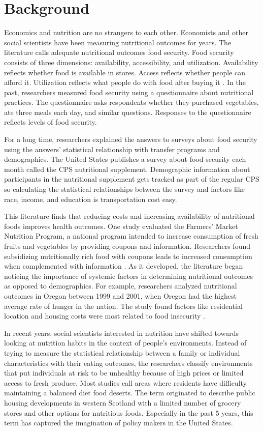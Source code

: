 \documentclass{report}
\begin{document}
\section{Background}

Economics and nutrition are no strangers to each other. Economists and other social scientists have been measuring nutritional outcomes for years. The literature calls adequate nutritional outcomes food security. Food security consists of three dimensions: availability, accessibility, and utilization. Availability reflects whether food is available in stores. Access reflects whether people can afford it. Utilization reflects what people do with food after buying it \cite{barrett}. In the past, researchers measured food security using a questionnaire about nutritional practices. The questionnaire asks respondents whether they purchased vegetables, ate three meals each day, and similar questions. Responses to the questionnaire reflects levels of food security.

For a long time, researchers explained the answers to surveys about food security using the answers' statistical relationship with transfer programs and demographics. The United States publishes a survey about food security each month called the CPS nutritional supplement. Demographic information about participants in the nutritional supplement gets tracked as part of the regular CPS so calculating the statistical relationships between the survey and factors like race, income, and education is transportation cost easy.

This literature finds that reducing costs and increasing availability of nutritional foods improves health outcomes. One study evaluated the Farmers' Market Nutrition Program, a national program intended to increase consumption of fresh fruits and vegetables by providing coupons and information. Researchers found subsidizing nutritionally rich food with coupons leads to increased consumption when complemented with information \cite{Just}. As it developed, the literature began noticing the importance of systemic factors in determining nutritional outcomes as opposed to demographics. For example, researchers analyzed nutritional outcomes in Oregon between 1999 and 2001, when Oregon had the highest average rate of hunger in the nation. The study found factors like residential location and housing costs were most related to food insecurity \cite{Bernell}.

In recent years, social scientists interested in nutrition have shifted towards looking at nutrition habits in the context of people's environments. Instead of trying to measure the statistical relationship between a family or individual characteristics with their eating outcomes, the researchers classify environments that put individuals at risk to be unhealthy because of high prices or limited access to fresh produce. Most studies call areas where residents have difficulty maintaining a balanced diet food deserts. The term originated to describe public housing developments in western Scotland with a limited number of grocery stores and other options for nutritious foods. Especially in the past 5 years, this term has captured the imagination of policy makers in the United States.
\end{document}

